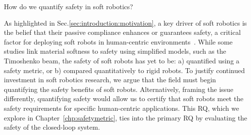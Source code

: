 \begin{researchquestion}\label{rq:soft_robotic_safety}
    How do we quantify safety in soft robotics?
\end{researchquestion}
As highlighted in Sec.\ref{sec:introduction:motivation}, a key driver of soft robotics is the belief that their passive compliance enhances or guarantees safety, a critical factor for deploying soft robots in human-centric environments~\citep{rus2015design, mengaldo2022concise}. While some studies link material softness to safety using simplified models, such as the Timoshenko beam\citep{abidi2017intrinsic}, the safety of soft robots has yet to be: a) quantified using a safety metric, 
or b) compared quantitatively to rigid robots.
To justify continued investment in soft robotics research, we argue that the field must begin quantifying the safety benefits of soft robots. Alternatively, framing the issue differently, quantifying safety would allow us to certify that soft robots meet the safety requirements for specific human-centric applications.
This \gls{RQ}, which we explore in Chapter~\ref{chp:safetymetric}, ties into the primary \gls{RQ} by evaluating the safety of the closed-loop system.

